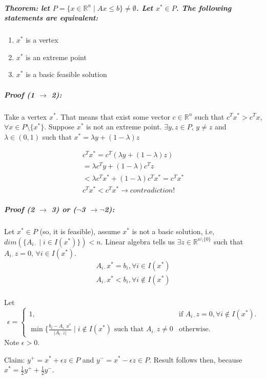 \documentclass[main]{subfiles}
\begin{document}
\subparagraph{Theorem: let $P=\{x \in \mathbb{R}^{n} \mid Ax \leq b \} \neq \emptyset$. Let
$x^{*} \in P$. The following statements are equivalent:}
\begin{enumerate}
\item $x^{*}$ is a vertex
\item $x^{*}$ is an extreme point
\item $x^{*}$ is a basic feasible solution
\end{enumerate}

\subparagraph{Proof (1 $\rightarrow$ 2):} Take a vertex $x^{*}$. That means that exist some
vector $c \in \mathbb{R}^{n}$ such that $c^{T}x^{*} > c^{T}x$, $\forall x \in
P\setminus\{x^{*}\}$. Suppose $x^{*}$ is not an extreme point.
$\exists y, z \in P$, $y \neq z$ and $\lambda \in (0,1)$ such that
$x^{*} = \lambda y + (1 - \lambda) z$

\begin{gather*}
c^{T}x^{*} = c^{T}(\lambda y + (1 - \lambda)z) \\
= \lambda c^{T}y + (1 - \lambda) c^{T}z \\
< \lambda c^{T}x^{*} + (1-\lambda) c^{T}x^{*} = c^{T}x^{*} \\
c^{T}x^{*} < c^{T}x^{*} \rightarrow contradiction!
\end{gather*}

\subparagraph{Proof (2 $\rightarrow$ 3) or ($\neg$3 $\rightarrow \neg$2):} Let $x^{*} \in P$ (so, it is feasible), assume $x^{*}$ is not a basic solution, i.e, $dim(\{A_{i\cdot} \mid i \in I(x^{*})\}) < n$.
Linear algebra tells us $\exists z \in \mathbb{R}^{n \setminus \{0\}}$ such that $A_{i\cdot} z = 0$, $\forall i \in I(x^{*})$.
\begin{gather*}
A_{i\cdot} x^{*} = b_{i}, \forall i \in I(x^{*}) \\
A_{i\cdot} x^{*} < b_{i}, \forall i \notin I(x^{*}) \\
\end{gather*}

Let
\begin{equation}
  \epsilon=\begin{cases}
    1, & \text{if $A_{i\cdot}z = 0, \forall i \notin I(x^{*})$}.\\
    \min\{\frac{b_{i} - A_{i\cdot}x^{*}}{|A_{i\cdot}z|} \mid i \notin I(x^{*}) \text{ such that } A_{i\cdot}z \neq 0 & \text{otherwise}.
  \end{cases}
\end{equation}
Note $\epsilon > 0$.

Claim: $y^{+} = x^{*} + \epsilon z \in P$ and $y^{-} = x^{*} - \epsilon z \in P$. Result follows then, because
$x^{*} = \frac{1}{2}y^{+} + \frac{1}{2}y^{-}$.
\end{document}
